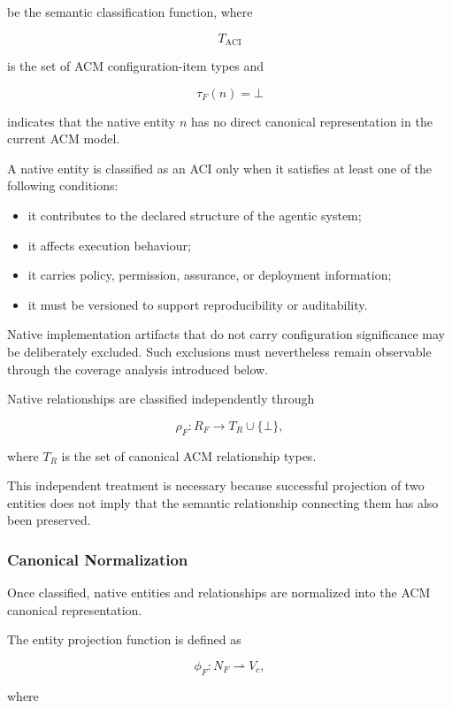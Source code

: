 \documentclass[10pt]{article}
\begin{document}
be the semantic classification function, where

\[
T_{\mathrm{ACI}}
\]

is the set of ACM configuration-item types and

\[
\tau_F(n)=\bot
\]

indicates that the native entity $n$ has no direct canonical representation in
the current ACM model.

A native entity is classified as an ACI only when it satisfies at least one of
the following conditions:

\begin{itemize}
	\item it contributes to the declared structure of the agentic system;
	\item it affects execution behaviour;
	\item it carries policy, permission, assurance, or deployment information;
	\item it must be versioned to support reproducibility or auditability.
\end{itemize}

Native implementation artifacts that do not carry configuration significance
may be deliberately excluded. Such exclusions must nevertheless remain
observable through the coverage analysis introduced below.

Native relationships are classified independently through

\[
\rho_F :
R_F
\rightarrow
T_R
\cup
\{\bot\},
\tag{41}
\]

where $T_R$ is the set of canonical ACM relationship types.

This independent treatment is necessary because successful projection of two
entities does not imply that the semantic relationship connecting them has also
been preserved.

\subsubsection{Canonical Normalization}

Once classified, native entities and relationships are normalized into the ACM
canonical representation.

The entity projection function is defined as

\[
\phi_F :
N_F
\rightharpoonup
V_c,
\tag{42}
\]

where
\end{document}
